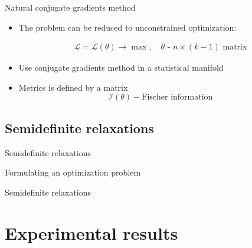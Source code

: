 \documentclass{beamer}
\theoremstyle{definition}
\theoremstyle{plain}
\theoremstyle{remark}
\begin{document}
			\begin{frame}{Natural conjugate gradients method} %
                \begin{itemize}
				    \item The problem can be reduced to unconstrained optimization:

                        \begin{equation}
                            \begin{aligned}
                            \nonumber
                            \mathcal L = \mathcal L(\theta) \longrightarrow \max, \quad \text{$\theta$ - $n\times(k-1)$ matrix}
                            \end{aligned}
                        \end{equation}

                    \item Use conjugate gradients method in a statistical manifold
                    \item Metrics is defined by a matrix
                        \[
                            \mathcal I(\theta) - \text{Fischer information}
                        \]
                \end{itemize}                
			\end{frame}

		\subsection{Semidefinite relaxations}
			\begin{frame}{Semidefinite relaxations}
				\begin{block}{Formulating an optimization problem}
				\end{block}
			\end{frame}

			\begin{frame}{Semidefinite relaxations}
				
			\end{frame}

	\section{Experimental results}
		\begin{frame}{}
				
		\end{frame}
\end{document}
